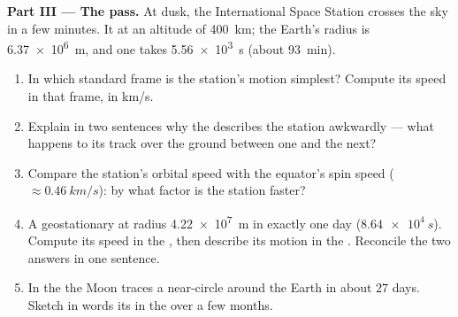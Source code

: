 \begin{problem}
\medskip
\noindent\textbf{Part III --- The  pass.}
At dusk, the International Space Station crosses the sky in a few
minutes. It  at an altitude of \qty{400}{km}; the Earth's radius
is \qty{6.37e6}{m}, and one  takes \qty{5.56e3}{s} (about
\qty{93}{min}).
\begin{enumerate}[resume]
  \item In which standard frame is the station's motion simplest?
        Compute its speed in that frame, in \unit{km/s}.
  \item Explain in two sentences why the  describes the
        station awkwardly --- what happens to its track over the ground
        between one  and the next?
  \item Compare the station's orbital speed with the equator's spin
        speed ($\approx \qty{0.46}{km/s}$): by what factor is the
        station faster?
  \item A geostationary   at radius \qty{4.22e7}{m} in
        exactly one day ($\qty{8.64e4}{s}$). Compute its speed in the
        , then describe its motion in the .
        Reconcile the two answers in one sentence.
  \item In the  the Moon traces a near-circle around
        the Earth in about $27$ days. Sketch in words its  in
        the  over a few months.
\end{enumerate}


\end{problem}
